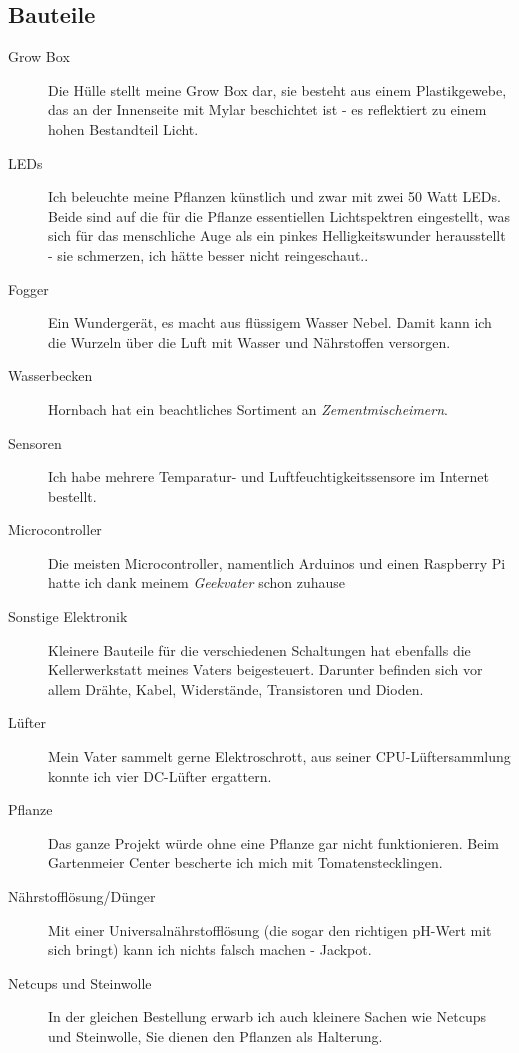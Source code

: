 \documentclass[12pt,titlepage,a4paper]{article}
\begin{document}
\subsection{Bauteile}
\begin{description}
\item[Grow Box] Die Hülle stellt meine Grow Box dar, sie besteht aus einem Plastikgewebe, das an der Innenseite mit Mylar beschichtet ist - es reflektiert zu einem hohen Bestandteil Licht. 
\item[LEDs] Ich beleuchte meine Pflanzen künstlich und zwar mit zwei 50 Watt LEDs. Beide sind auf die für die Pflanze essentiellen Lichtspektren eingestellt, was sich für das menschliche Auge als ein pinkes Helligkeitswunder herausstellt - sie schmerzen, ich hätte besser nicht reingeschaut..
\item[Fogger] Ein Wundergerät, es macht aus flüssigem Wasser Nebel. Damit kann ich die Wurzeln über die Luft mit Wasser und Nährstoffen versorgen.
\item[Wasserbecken] Hornbach hat ein beachtliches Sortiment an \textit{Zementmischeimern}.
\item[Sensoren] Ich habe mehrere Temparatur- und Luftfeuchtigkeitssensore im Internet bestellt.
\item[Microcontroller] Die meisten Microcontroller, namentlich Arduinos und einen Raspberry Pi hatte ich dank meinem \textit{Geekvater} schon zuhause
\item[Sonstige Elektronik] Kleinere Bauteile für die verschiedenen Schaltungen hat ebenfalls die Kellerwerkstatt meines Vaters beigesteuert. Darunter befinden sich vor allem Drähte, Kabel, Widerstände,  Transistoren und Dioden.
\item[Lüfter] Mein Vater sammelt gerne Elektroschrott, aus seiner CPU-Lüftersammlung konnte ich vier DC-Lüfter ergattern.
\item[Pflanze] Das ganze Projekt würde ohne eine Pflanze gar nicht funktionieren. Beim Gartenmeier Center bescherte ich mich mit Tomatenstecklingen.
\item[Nährstofflösung/Dünger] Mit einer Universalnährstofflösung (die sogar den richtigen pH-Wert mit sich bringt) kann ich nichts falsch machen - Jackpot.
\item[Netcups und Steinwolle] In der gleichen Bestellung erwarb ich auch kleinere Sachen wie Netcups und Steinwolle, Sie dienen den Pflanzen als Halterung.
\end{description}
\end{document}
